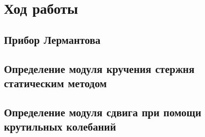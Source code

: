 \section{Ход работы}
\subsection{Прибор Лермантова}

\subsection{Определение модуля кручения стержня статическим методом}

\subsection{Определение модуля сдвига при помощи крутильных колебаний}

